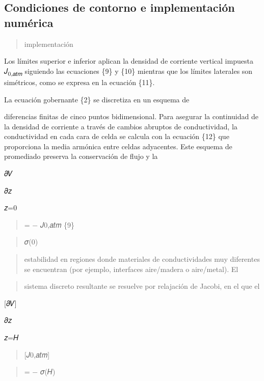 \documentclass[
]{article}
\begin{document}
\subsection{Condiciones de contorno e implementación
numérica}\label{condiciones-de-contorno-e-implementaciuxf3n-numuxe9rica}

\begin{quote}
implementación
\end{quote}

Los límites superior e inferior aplican la densidad de corriente
vertical impuesta 𝐽\textsubscript{0,𝑎𝑡𝑚} siguiendo las ecuaciones \{9\}
y \{10\} mientras que los límites laterales son simétricos, como se
expresa en la ecuación \{11\}.

La ecuación gobernante \{2\} se discretiza en un esquema de

diferencias finitas de cinco puntos bidimensional. Para asegurar la
continuidad de la densidad de corriente a través de cambios abruptos de
conductividad, la conductividad en cada cara de celda se calcula con la
ecuación \{12\} que proporciona la media armónica entre celdas
adyacentes. Este esquema de promediado preserva la conservación de flujo
y la

𝜕𝑉

𝜕𝑧

𝑧=0

\begin{quote}
= − 𝐽0,𝑎𝑡𝑚 \{9\}
\end{quote}

\begin{quote}
𝜎(0)
\end{quote}

\begin{quote}
estabilidad en regiones donde materiales de conductividades muy
diferentes se encuentran (por ejemplo, interfaces aire/madera o
aire/metal). El
\end{quote}

\begin{quote}
sistema discreto resultante se resuelve por relajación de Jacobi, en el
que el
\end{quote}

{[}𝜕𝑉{]}

𝜕𝑧

𝑧=𝐻

\begin{quote}
{[}𝐽0,𝑎𝑡𝑚{]}
\end{quote}

\begin{quote}
= − 𝜎(𝐻)
\end{quote}
\end{document}
